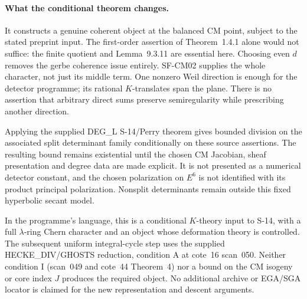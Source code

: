 \paragraph{What the conditional theorem changes.}
It constructs a genuine coherent object at the balanced CM point,
subject to the stated preprint input. The first-order assertion of
Theorem~1.4.1 alone would not suffice: the finite quotient and
Lemma~9.3.11 are essential here. Choosing even $d$ removes the gerbe
coherence issue entirely. SF-CM02 supplies the whole character, not
just its middle term. One nonzero Weil direction is enough for the
detector programme; its rational $K$-translates span the plane.
There is no assertion that arbitrary direct sums preserve
semiregularity while prescribing another direction.

Applying the supplied DEG\_L S-14/Perry theorem gives bounded
division on the associated split determinant family conditionally
on these source assertions. The resulting bound remains
existential until the chosen CM Jacobian, sheaf presentation and
degree data are made explicit. It is not presented as a numerical
detector constant, and the chosen polarization on $E^6$ is not
identified with its product principal polarization. Nonsplit
determinants remain outside this fixed hyperbolic secant model.

In the programme's language, this is a conditional $K$-theory input
to S-14, with a full $\lambda$-ring Chern character and an object
whose deformation theory is controlled. The subsequent uniform
integral-cycle step uses the supplied HECKE\_DIV/GHOSTS reduction,
condition A at cote~16 scan~050. Neither condition I (scan~049 and
cote~44 Theorem~4) nor a bound on the CM isogeny or core index $J$
produces the required object. No additional archive or EGA/SGA
locator is claimed for the new representation and descent arguments.
